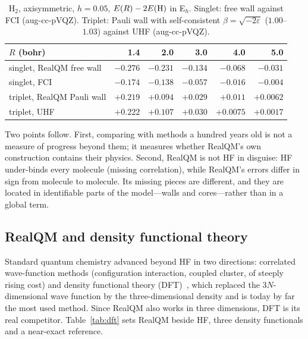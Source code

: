 \documentclass[11pt]{article}
\begin{document}
\begin{table}[ht]
\centering
\caption{H$_2$, axisymmetric, $h=0.05$, $E(R)-2E({\rm H})$ in E$_h$. Singlet: free wall against FCI
(aug-cc-pVQZ). Triplet: Pauli wall with self-consistent $\beta=\sqrt{-2\varepsilon}$ ($1.00$--$1.03$)
against UHF (aug-cc-pVQZ).}
\label{tab:h2st}
\begin{tabular}{lrrrrr}
\hline
$R$ (bohr) & 1.4 & 2.0 & 3.0 & 4.0 & 5.0 \\
\hline
singlet, RealQM free wall & $-0.276$ & $-0.231$ & $-0.134$ & $-0.068$ & $-0.031$ \\
singlet, FCI & $-0.174$ & $-0.138$ & $-0.057$ & $-0.016$ & $-0.004$ \\
triplet, RealQM Pauli wall & $+0.219$ & $+0.094$ & $+0.029$ & $+0.011$ & $+0.0062$ \\
triplet, UHF & $+0.222$ & $+0.107$ & $+0.030$ & $+0.0075$ & $+0.0017$ \\
\hline
\end{tabular}
\end{table}

Two points follow. First, comparing with methods a hundred years old is not a measure of progress
beyond them; it measures whether RealQM's own construction contains their physics. Second, RealQM is
not HF in disguise: HF under-binds every molecule (missing correlation), while RealQM's errors differ in
sign from molecule to molecule. Its missing pieces are different, and they are located in identifiable
parts of the model---walls and cores---rather than in a global term.

\subsection{RealQM and density functional theory}

Standard quantum chemistry advanced beyond HF in two directions: correlated wave-function methods
(configuration interaction, coupled cluster, of steeply rising cost) and density functional theory
(DFT)~\cite{hk,ks}, which replaced the $3N$-dimensional wave function by the three-dimensional density
and is today by far the most used method. Since RealQM also works in three dimensions, DFT is its
real competitor. Table~\ref{tab:dft} sets RealQM beside HF, three density functionals and a near-exact
reference.
\end{document}
